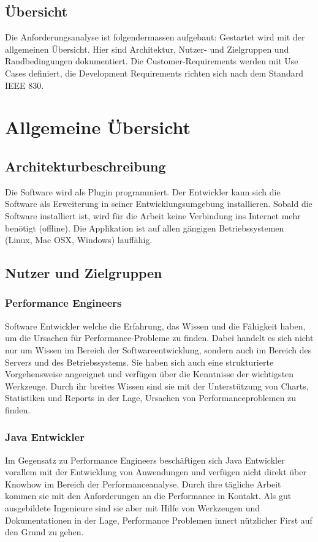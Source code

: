 \subsection{Übersicht}
Die Anforderungsanalyse ist folgendermassen aufgebaut: Gestartet wird mit der allgemeinen Übersicht. Hier sind Architektur, Nutzer- und Zielgruppen und Randbedingungen dokumentiert. Die Customer-Requirements werden mit Use Cases definiert, die Development Requirements richten sich nach dem Standard IEEE 830.

\section{Allgemeine Übersicht}\label{allgemeine_uebersicht}
\subsection{Architekturbeschreibung}
Die Software wird als Plugin programmiert. Der Entwickler kann sich die Software als Erweiterung in seiner Entwicklungsumgebung installieren. Sobald die Software installiert ist, wird für die Arbeit keine Verbindung ins Internet mehr benötigt (offline). Die Applikation ist auf allen gängigen Betriebssystemen (Linux, Mac OSX, Windows) lauffähig.

\subsection{Nutzer und Zielgruppen}
\subsubsection{Performance Engineers}
Software Entwickler welche die Erfahrung, das Wissen und die Fähigkeit haben, um die Ursachen für Performance-Probleme zu finden. Dabei handelt es sich nicht nur um Wissen im Bereich der Softwareentwicklung, sondern auch im Bereich des Servers und des Betriebssystems. Sie haben sich auch eine strukturierte Vorgehensweise angeeignet und verfügen über die Kenntnisse der wichtigsten Werkzeuge. Durch ihr breites Wissen sind sie mit der Unterstützung von Charts, Statistiken und Reports in der Lage, Ursachen von Performanceproblemen zu finden.

\subsubsection{Java Entwickler}
Im Gegensatz zu Performance Engineers beschäftigen sich Java Entwickler vorallem mit der Entwicklung von Anwendungen und verfügen nicht direkt über Knowhow im Bereich der Performanceanalyse. Durch ihre tägliche Arbeit kommen sie mit den Anforderungen an die Performance in Kontakt. Als gut ausgebildete Ingenieure sind sie aber mit Hilfe von Werkzeugen und Dokumentationen in der Lage, Performance Problemen innert nützlicher First auf den Grund zu gehen.

